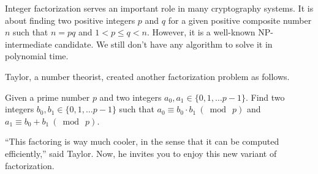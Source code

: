 Integer factorization serves an important role in many cryptography systems. 
It is about finding two positive integers $p$ and $q$ 
for a given positive composite number $n$
such that $n=pq$ and $1<p\le q<n$.
However, it is a well-known NP-intermediate candidate. 
We still don't have any algorithm to solve it in polynomial time.

Taylor, a number theorist, created another factorization problem as follows.

Given a prime number $p$ and two integers $a_0, a_1\in\{0,1,\dots p-1\}$. 
Find two integers $b_0, b_1\in\{0,1,\dots p-1\}$ such that 
$a_0\equiv b_0\cdot b_1~(\bmod~p)$ and $a_1\equiv b_0+b_1~(\bmod~p)$.

``This factoring is way much cooler, in the sense that it can
be computed efficiently,'' said Taylor. 
Now, he invites you to enjoy this new variant of factorization.
